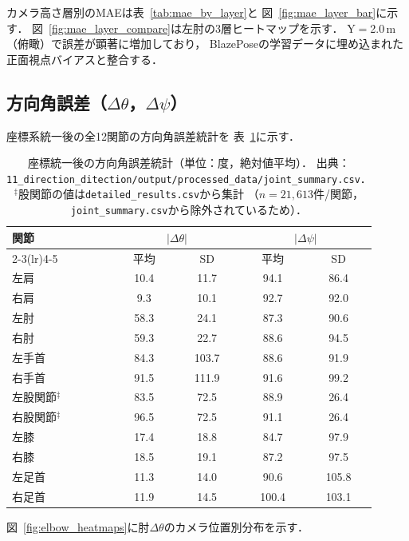 \documentclass[twocolumn]{article}
\begin{document}
カメラ高さ層別のMAEは表~\ref{tab:mae_by_layer}と
図~\ref{fig:mae_layer_bar}に示す．
図~\ref{fig:mae_layer_compare}は左肘の3層ヒートマップを示す．
Y$=$2.0\,m（俯瞰）で誤差が顕著に増加しており，
BlazePoseの学習データに埋め込まれた正面視点バイアスと整合する．

\subsection{方向角誤差（$\Delta\theta$，$\Delta\psi$）}

座標系統一後の全12関節の方向角誤差統計を
表~\ref{tab:direction_angle_error}に示す．

\begin{table}[!t]
\centering
\caption{座標統一後の方向角誤差統計（単位：度，絶対値平均）．
  出典：\texttt{11\_direction\_ditection/output/processed\_data/joint\_summary.csv}．
  $^\ddagger$股関節の値は\texttt{detailed\_results.csv}から集計
  （$n=21{,}613$件/関節，\texttt{joint\_summary.csv}から除外されているため）．}
\label{tab:direction_angle_error}
\small
\begin{tabular}{lcccc}
\toprule
関節 & \multicolumn{2}{c}{$|\Delta\theta|$} & \multicolumn{2}{c}{$|\Delta\psi|$} \\
\cmidrule(lr){2-3}\cmidrule(lr){4-5}
     & 平均 & SD & 平均 & SD \\
\midrule
左肩   & 10.4 & 11.7 & 94.1 & 86.4 \\
右肩   &  9.3 & 10.1 & 92.7 & 92.0 \\
左肘   & 58.3 & 24.1 & 87.3 & 90.6 \\
右肘   & 59.3 & 22.7 & 88.6 & 94.5 \\
左手首 & 84.3 & 103.7 & 88.6 & 91.9 \\
右手首 & 91.5 & 111.9 & 91.6 & 99.2 \\
左股関節$^\ddagger$ & 83.5 & 72.5 & 88.9 & 26.4 \\
右股関節$^\ddagger$ & 96.5 & 72.5 & 91.1 & 26.4 \\
左膝   & 17.4 & 18.8 & 84.7 & 97.9 \\
右膝   & 18.5 & 19.1 & 87.2 & 97.5 \\
左足首 & 11.3 & 14.0 & 90.6 & 105.8 \\
右足首 & 11.9 & 14.5 & 100.4 & 103.1 \\
\bottomrule
\end{tabular}
\end{table}

図~\ref{fig:elbow_heatmaps}に肘$\Delta\theta$のカメラ位置別分布を示す．
\end{document}
